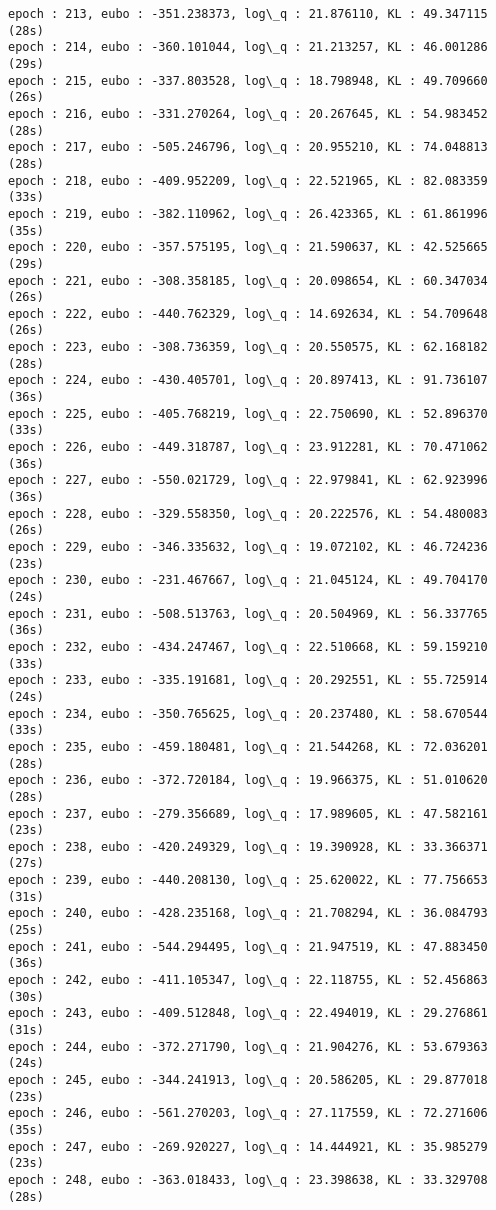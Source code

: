 \documentclass[11pt]{article}
\begin{document}
\begin{Verbatim}[commandchars=\\\{\}]
epoch : 213, eubo : -351.238373, log\_q : 21.876110, KL : 49.347115 (28s)
epoch : 214, eubo : -360.101044, log\_q : 21.213257, KL : 46.001286 (29s)
epoch : 215, eubo : -337.803528, log\_q : 18.798948, KL : 49.709660 (26s)
epoch : 216, eubo : -331.270264, log\_q : 20.267645, KL : 54.983452 (28s)
epoch : 217, eubo : -505.246796, log\_q : 20.955210, KL : 74.048813 (28s)
epoch : 218, eubo : -409.952209, log\_q : 22.521965, KL : 82.083359 (33s)
epoch : 219, eubo : -382.110962, log\_q : 26.423365, KL : 61.861996 (35s)
epoch : 220, eubo : -357.575195, log\_q : 21.590637, KL : 42.525665 (29s)
epoch : 221, eubo : -308.358185, log\_q : 20.098654, KL : 60.347034 (26s)
epoch : 222, eubo : -440.762329, log\_q : 14.692634, KL : 54.709648 (26s)
epoch : 223, eubo : -308.736359, log\_q : 20.550575, KL : 62.168182 (28s)
epoch : 224, eubo : -430.405701, log\_q : 20.897413, KL : 91.736107 (36s)
epoch : 225, eubo : -405.768219, log\_q : 22.750690, KL : 52.896370 (33s)
epoch : 226, eubo : -449.318787, log\_q : 23.912281, KL : 70.471062 (36s)
epoch : 227, eubo : -550.021729, log\_q : 22.979841, KL : 62.923996 (36s)
epoch : 228, eubo : -329.558350, log\_q : 20.222576, KL : 54.480083 (26s)
epoch : 229, eubo : -346.335632, log\_q : 19.072102, KL : 46.724236 (23s)
epoch : 230, eubo : -231.467667, log\_q : 21.045124, KL : 49.704170 (24s)
epoch : 231, eubo : -508.513763, log\_q : 20.504969, KL : 56.337765 (36s)
epoch : 232, eubo : -434.247467, log\_q : 22.510668, KL : 59.159210 (33s)
epoch : 233, eubo : -335.191681, log\_q : 20.292551, KL : 55.725914 (24s)
epoch : 234, eubo : -350.765625, log\_q : 20.237480, KL : 58.670544 (33s)
epoch : 235, eubo : -459.180481, log\_q : 21.544268, KL : 72.036201 (28s)
epoch : 236, eubo : -372.720184, log\_q : 19.966375, KL : 51.010620 (28s)
epoch : 237, eubo : -279.356689, log\_q : 17.989605, KL : 47.582161 (23s)
epoch : 238, eubo : -420.249329, log\_q : 19.390928, KL : 33.366371 (27s)
epoch : 239, eubo : -440.208130, log\_q : 25.620022, KL : 77.756653 (31s)
epoch : 240, eubo : -428.235168, log\_q : 21.708294, KL : 36.084793 (25s)
epoch : 241, eubo : -544.294495, log\_q : 21.947519, KL : 47.883450 (36s)
epoch : 242, eubo : -411.105347, log\_q : 22.118755, KL : 52.456863 (30s)
epoch : 243, eubo : -409.512848, log\_q : 22.494019, KL : 29.276861 (31s)
epoch : 244, eubo : -372.271790, log\_q : 21.904276, KL : 53.679363 (24s)
epoch : 245, eubo : -344.241913, log\_q : 20.586205, KL : 29.877018 (23s)
epoch : 246, eubo : -561.270203, log\_q : 27.117559, KL : 72.271606 (35s)
epoch : 247, eubo : -269.920227, log\_q : 14.444921, KL : 35.985279 (23s)
epoch : 248, eubo : -363.018433, log\_q : 23.398638, KL : 33.329708 (28s)

\end{Verbatim}
\end{document}
